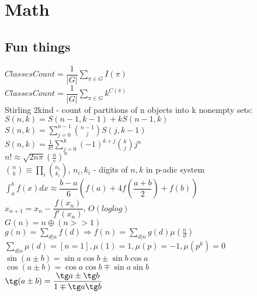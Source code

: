 \chapter{Math}

{}
{}
{}
\columnbreak
\section{Fun things}
$ClassesCount = \dfrac{1}{|G|} \sum_{\pi \in G} I(\pi)$\\
$ClassesCount = \dfrac{1}{|G|} \sum_{\pi \in G} k^{C(\pi)}$\\
Stirling 2kind - count of partitions of n objects into k nonempty sets:\\
$S(n,k) = S(n-1,k-1) + kS(n-1,k)$\\
$S(n,k) = \sum_{j=0}^{n-1} \binom{n-1}{j}S(j,k-1)$\\
$S(n,k) = \frac{1}{k!}\sum_{j=0}^k(-1)^{k+j}\binom{k}{j}j^n$\\
$n! \approx \sqrt{2n\pi}(\frac{n}{e})^n$\\
$\binom{n}{k} \equiv \prod_{i}\binom{n_i}{k_i}$, $n_i, k_i$ - digits of $n,k$ in p-adic system
$\int_{a}^{b}f(x)dx \approx \dfrac{b-a}{6}(f(a) + 4f(\dfrac{a+b}
{2})+f(b))$\\
$x_{n+1} = x_n - \dfrac{f(x_n)}{f'(x_n)}$, $O(loglog)$\\
$G(n) = n \oplus (n >> 1)$\\
$g(n) = \sum_{d|n} f(d) \Rightarrow f(n) = \sum_{d|n} g(d) \mu(\frac{n}{d})$\\
$\sum_{d|n} \mu(d) = [n = 1],   \mu(1) = 1, \mu(p) = -1, \mu(p^k) = 0$\\
$\sin(a \pm b) = \sin a \cos b \pm \sin b \cos a$\\
$\cos(a \pm b) = \cos a \cos b \mp \sin a \sin b$\\
$\tg(a\pm b) = \dfrac{\tg a \pm \tg b}{1 \mp \tg a \tg b}$\\
